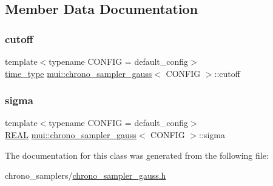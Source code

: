 \subsection{Member Data Documentation}
\mbox{\label{classmui_1_1chrono__sampler__gauss_a279b7de2f573d7a6f7316b4748eb3ec4}} 
\subsubsection{\texorpdfstring{cutoff}{cutoff}}
{\footnotesize\ttfamily template$<$typename C\+O\+N\+F\+IG  = default\+\_\+config$>$ \\
\hyperlink{classmui_1_1chrono__sampler__gauss_accb8778472734fd419da15b26e087a41}{time\+\_\+type} \hyperlink{classmui_1_1chrono__sampler__gauss}{mui\+::chrono\+\_\+sampler\+\_\+gauss}$<$ C\+O\+N\+F\+IG $>$\+::cutoff\hspace{0.3cm}{\ttfamily [protected]}}

\mbox{\label{classmui_1_1chrono__sampler__gauss_a10b2a032bbbebecf559a0fe3fbf92714}} 
\subsubsection{\texorpdfstring{sigma}{sigma}}
{\footnotesize\ttfamily template$<$typename C\+O\+N\+F\+IG  = default\+\_\+config$>$ \\
\hyperlink{classmui_1_1chrono__sampler__gauss_acb55ad8350ad77bd80ea3979bc01f7a5}{R\+E\+AL} \hyperlink{classmui_1_1chrono__sampler__gauss}{mui\+::chrono\+\_\+sampler\+\_\+gauss}$<$ C\+O\+N\+F\+IG $>$\+::sigma\hspace{0.3cm}{\ttfamily [protected]}}



The documentation for this class was generated from the following file\+:\begin{DoxyCompactItemize}
\item 
chrono\+\_\+samplers/\hyperlink{chrono__sampler__gauss_8h}{chrono\+\_\+sampler\+\_\+gauss.\+h}\end{DoxyCompactItemize}
